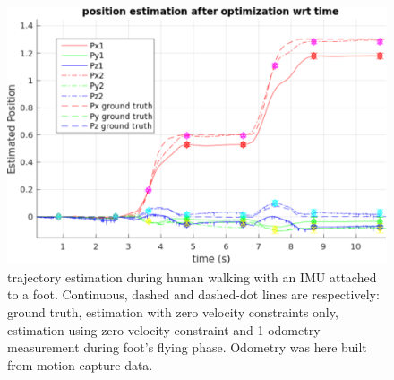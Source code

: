 
\begin{figure}[tb]
\centering
\includegraphics[scale=0.47]{figures/Result_position}
\caption{ 
trajectory estimation during human walking with an IMU attached to a foot. Continuous, dashed and dashed-dot lines are respectively: ground truth, 
estimation with zero velocity constraints only, estimation using zero velocity constraint and 1 odometry measurement during foot's flying phase. Odometry was here built from motion capture data.
}
\label{fig:forward_walk_IRI}
\end{figure}

